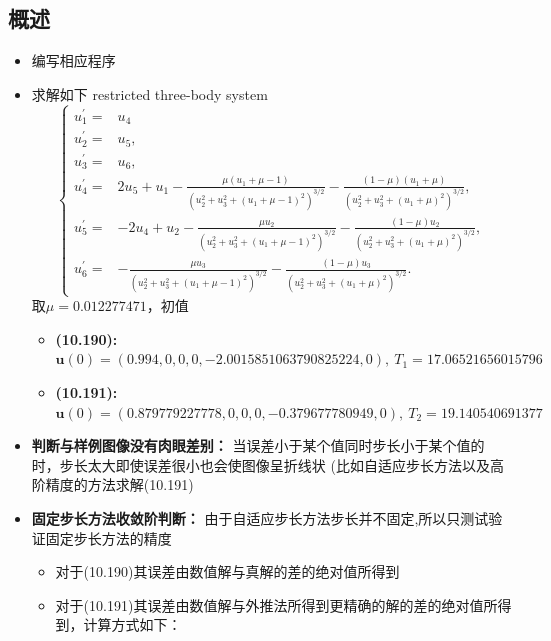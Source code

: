 \documentclass{article}
\begin{document}
\subsection{概述}
\begin{itemize}
    \item 编写相应程序
    \item 求解如下 restricted three-body system 
    $$
    \left\{\begin{aligned}
        u_{1}^{\prime}= & u_{4} \\
        u_{2}^{\prime}= & u_{5}, \\
        u_{3}^{\prime}= & u_{6}, \\
        u_{4}^{\prime}= & 2 u_{5}+u_{1}-\frac{\mu\left(u_{1}+\mu-1\right)}{\left(u_{2}^{2}+u_{3}^{2}+\left(u_{1}+\mu-1\right)^{2}\right)^{3 / 2}} -\frac{(1-\mu)\left(u_{1}+\mu\right)}{\left(u_{2}^{2}+u_{3}^{2}+\left(u_{1}+\mu\right)^{2}\right)^{3 / 2}}, \\
        u_{5}^{\prime}= & -2 u_{4}+u_{2}-\frac{\mu u_{2}}{\left(u_{2}^{2}+u_{3}^{2}+\left(u_{1}+\mu-1\right)^{2}\right)^{3 / 2}}-\frac{(1-\mu) u_{2}}{\left(u_{2}^{2}+u_{3}^{2}+\left(u_{1}+\mu\right)^{2}\right)^{3 / 2}}, \\
        u_{6}^{\prime}= & -\frac{\mu u_{3}}{\left(u_{2}^{2}+u_{3}^{2}+\left(u_{1}+\mu-1\right)^{2}\right)^{3 / 2}} -\frac{(1-\mu) u_{3}}{\left(u_{2}^{2}+u_{3}^{2}+\left(u_{1}+\mu\right)^{2}\right)^{3 / 2}} .
        \end{aligned}\right.
    $$
    取$\mu = 0.012277471$，初值
    \begin{itemize}
        \item \textbf{(10.190):} $\mathbf{u}(0)=(0.994,0,0,0,-2.0015851063790825224,0),\ T_1 = 17.06521656015796$
        \item \textbf{(10.191):} $\mathbf{u}(0)=(0.879779227778,0,0,0,-0.379677780949,0),\ T_2 = 19.140540691377$
    \end{itemize}
    \item \textbf{判断与样例图像没有肉眼差别：} 当误差小于某个值同时步长小于某个值的时，步长太大即使误差很小也会使图像呈折线状 (比如自适应步长方法以及高阶精度的方法求解(10.191)
    \item \textbf{固定步长方法收敛阶判断：} 由于自适应步长方法步长并不固定,所以只测试验证固定步长方法的精度
    \begin{itemize}
        \item 对于(10.190)其误差由数值解与真解的差的绝对值所得到
        \item 对于(10.191)其误差由数值解与外推法所得到更精确的解的差的绝对值所得到，计算方式如下：
        

\end{itemize}
\end{itemize}
\end{document}
